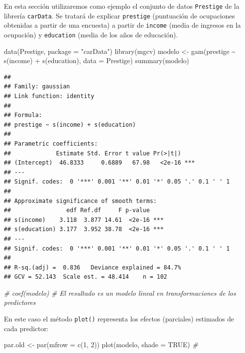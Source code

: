 \documentclass[
  spanish,
]{book}
\newenvironment{Shaded}{\begin{snugshade}}{\end{snugshade}}
\newcommand{\AttributeTok}[1]{\textcolor[rgb]{0.77,0.63,0.00}{#1}}
\newcommand{\CommentTok}[1]{\textcolor[rgb]{0.56,0.35,0.01}{\textit{#1}}}
\newcommand{\ConstantTok}[1]{\textcolor[rgb]{0.00,0.00,0.00}{#1}}
\newcommand{\DecValTok}[1]{\textcolor[rgb]{0.00,0.00,0.81}{#1}}
\newcommand{\FunctionTok}[1]{\textcolor[rgb]{0.00,0.00,0.00}{#1}}
\newcommand{\NormalTok}[1]{#1}
\newcommand{\OtherTok}[1]{\textcolor[rgb]{0.56,0.35,0.01}{#1}}
\newcommand{\SpecialCharTok}[1]{\textcolor[rgb]{0.00,0.00,0.00}{#1}}
\newcommand{\StringTok}[1]{\textcolor[rgb]{0.31,0.60,0.02}{#1}}
\theoremstyle{break}
\theoremstyle{definition}
\theoremstyle{definition}
\theoremstyle{definition}
\theoremstyle{definition}
\theoremstyle{remark}
\begin{document}
En esta sección utilizaremos como ejemplo el conjunto de datos \texttt{Prestige} de la librería \texttt{carData}.
Se tratará de explicar \texttt{prestige} (puntuación de ocupaciones obtenidas a partir de una encuesta) a partir de \texttt{income} (media de ingresos en la ocupación) y \texttt{education} (media de los años de educación).

\begin{Shaded}
\begin{Highlighting}[]
\FunctionTok{data}\NormalTok{(Prestige, }\AttributeTok{package =} \StringTok{"carData"}\NormalTok{)}
\FunctionTok{library}\NormalTok{(mgcv)}
\NormalTok{modelo }\OtherTok{\textless{}{-}} \FunctionTok{gam}\NormalTok{(prestige }\SpecialCharTok{\textasciitilde{}} \FunctionTok{s}\NormalTok{(income) }\SpecialCharTok{+} \FunctionTok{s}\NormalTok{(education), }\AttributeTok{data =}\NormalTok{ Prestige)}
\FunctionTok{summary}\NormalTok{(modelo)}
\end{Highlighting}
\end{Shaded}

\begin{verbatim}
## 
## Family: gaussian 
## Link function: identity 
## 
## Formula:
## prestige ~ s(income) + s(education)
## 
## Parametric coefficients:
##             Estimate Std. Error t value Pr(>|t|)    
## (Intercept)  46.8333     0.6889   67.98   <2e-16 ***
## ---
## Signif. codes:  0 '***' 0.001 '**' 0.01 '*' 0.05 '.' 0.1 ' ' 1
## 
## Approximate significance of smooth terms:
##                edf Ref.df     F p-value    
## s(income)    3.118  3.877 14.61  <2e-16 ***
## s(education) 3.177  3.952 38.78  <2e-16 ***
## ---
## Signif. codes:  0 '***' 0.001 '**' 0.01 '*' 0.05 '.' 0.1 ' ' 1
## 
## R-sq.(adj) =  0.836   Deviance explained = 84.7%
## GCV = 52.143  Scale est. = 48.414    n = 102
\end{verbatim}

\begin{Shaded}
\begin{Highlighting}[]
\CommentTok{\# coef(modelo) \# El resultado es un modelo lineal en transformaciones de los predictores}
\end{Highlighting}
\end{Shaded}

En este caso el método \texttt{plot()} representa los efectos (parciales) estimados de cada predictor:

\begin{Shaded}
\begin{Highlighting}[]
\NormalTok{par.old }\OtherTok{\textless{}{-}} \FunctionTok{par}\NormalTok{(}\AttributeTok{mfrow =} \FunctionTok{c}\NormalTok{(}\DecValTok{1}\NormalTok{, }\DecValTok{2}\NormalTok{))}
\FunctionTok{plot}\NormalTok{(modelo, }\AttributeTok{shade =} \ConstantTok{TRUE}\NormalTok{) }\CommentTok{\# }
\end{Highlighting}
\end{Shaded}
\end{document}
